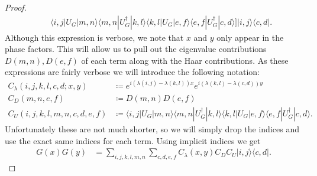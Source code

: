 \documentclass{article}
\newcommand{\ket}[1]{|#1\rangle}
\newcommand{\bra}[1]{\langle #1|}
\newcommand{\ketbra}[2]{| #1\rangle\! \langle #2|}
\begin{document}
\begin{proof}
\begin{align}
    & \quad \bra{i,j} U_G \ket{m,n} \bra{m,n} U_G^\dagger \ket{k,l} \bra{k,l} U_G \ket{e,f} \bra{e,f} U_G^\dagger \ket{c,d} \bigg] \ketbra{i,j}{c,d}.
\end{align}
Although this expression is verbose, we note that $x$ and $y$ only appear in the phase factors. This will allow us to pull out the eigenvalue contributions $D(m,n), D(e,f)$ of each term along with the Haar contributions. As these expressions are fairly verbose we will introduce the following notation:
\begin{align}
    C_\lambda(i,j,k,l,c,d; x, y) &\coloneqq e^{i(\lambda(i,j) - \lambda(k,l))x} e^{i(\lambda(k,l) - \lambda(c,d))y} \\
    C_D(m,n,e,f) &\coloneqq D(m,n) D(e,f) \\
    C_U(i,j,k,l,m,n,c,d,e,f) &\coloneqq \bra{i,j} U_G \ket{m,n} \bra{m,n} U_G^\dagger \ket{k,l} \bra{k,l} U_G \ket{e,f} \bra{e,f} U_G^\dagger \ket{c,d}.
\end{align}
Unfortunately these are not much shorter, so we will simply drop the indices and use the exact same indices for each term. Using implicit indices we get
\begin{align}
    G(x) G(y) &= \sum_{i,j,k,l,m,n} \sum_{c,d,e,f} C_\lambda(x,y) C_D C_U \ketbra{i,j}{c,d}.
\end{align}


\end{proof}
\end{document}

